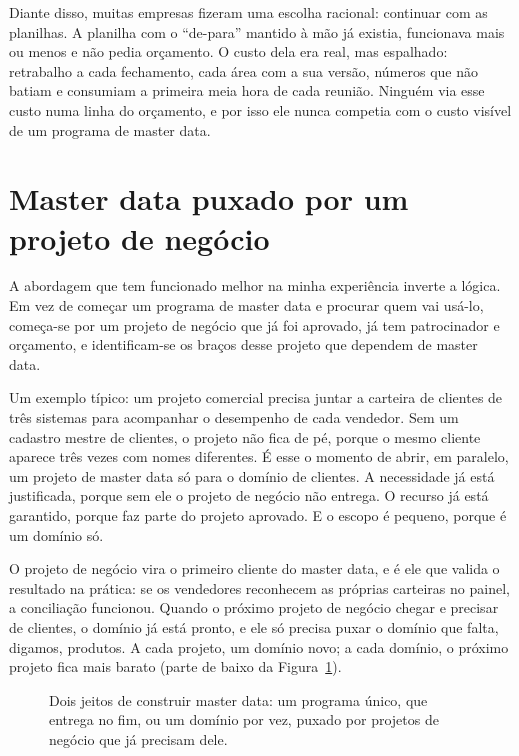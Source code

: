 Diante disso, muitas empresas fizeram uma escolha racional: continuar com as planilhas. A
planilha com o \enquote{de-para} mantido à mão já existia, funcionava mais ou menos e não
pedia orçamento. O custo dela era real, mas espalhado: retrabalho a cada fechamento, cada
área com a sua versão, números que não batiam e consumiam a primeira meia hora de cada
reunião. Ninguém via esse custo numa linha do orçamento, e por isso ele nunca competia com
o custo visível de um programa de master data.


\section{Master data puxado por um projeto de negócio}
\label{sec:master-data-puxado}

A abordagem que tem funcionado melhor na minha experiência inverte a lógica. Em vez de
começar um programa de master data e procurar quem vai usá-lo, começa-se por um projeto de
negócio que já foi aprovado, já tem patrocinador e orçamento, e identificam-se os braços
desse projeto que dependem de master data.

Um exemplo típico: um projeto comercial precisa juntar a carteira de clientes de três
sistemas para acompanhar o desempenho de cada vendedor. Sem um cadastro mestre de clientes,
o projeto não fica de pé, porque o mesmo cliente aparece três vezes com nomes diferentes. É
esse o momento de abrir, em paralelo, um projeto de master data só para o domínio de
clientes. A necessidade já está justificada, porque sem ele o projeto de negócio não
entrega. O recurso já está garantido, porque faz parte do projeto aprovado. E o escopo é
pequeno, porque é um domínio só.

O projeto de negócio vira o primeiro cliente do master data, e é ele que valida o
resultado na prática: se os vendedores reconhecem as próprias carteiras no painel, a
conciliação funcionou. Quando o próximo projeto de negócio chegar e precisar de clientes,
o domínio já está pronto, e ele só precisa puxar o domínio que falta, digamos, produtos. A
cada projeto, um domínio novo; a cada domínio, o próximo projeto fica mais barato (parte de
baixo da Figura~\ref{fig:master-data-abordagens}).

\begin{figure}[htbp]
  \centering
  
  \caption{Dois jeitos de construir master data: um programa único, que entrega no
    fim, ou um domínio por vez, puxado por projetos de negócio que já precisam dele.}
  \label{fig:master-data-abordagens}
\end{figure}

